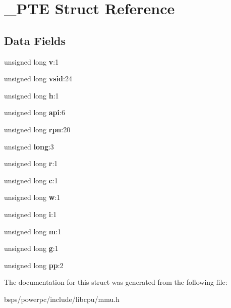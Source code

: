\hypertarget{struct__PTE}{}\section{\+\_\+\+P\+TE Struct Reference}
\label{struct__PTE}
\subsection*{Data Fields}
\begin{DoxyCompactItemize}
\item 
\mbox{\label{struct__PTE_a70ad49ce44082989ff1f60711ac51748}} 
unsigned long {\bfseries v}\+:1
\item 
\mbox{\label{struct__PTE_ac9c646f44d5a310f3ac6ddd9509c4a63}} 
unsigned long {\bfseries vsid}\+:24
\item 
\mbox{\label{struct__PTE_a904024784e0847ef42a912ab118cf076}} 
unsigned long {\bfseries h}\+:1
\item 
\mbox{\label{struct__PTE_af555329e27c18bd6774c843ef9d77883}} 
unsigned long {\bfseries api}\+:6
\item 
\mbox{\label{struct__PTE_a1af864ad9c7d66af85899ac195d205fe}} 
unsigned long {\bfseries rpn}\+:20
\item 
\mbox{\label{struct__PTE_a8372f14e7e33b411216048b5236528a8}} 
unsigned {\bfseries long}\+:3
\item 
\mbox{\label{struct__PTE_ab05728d02334349ec34102603190da11}} 
unsigned long {\bfseries r}\+:1
\item 
\mbox{\label{struct__PTE_a879a5ebfc7fc5fd881fb7c9452f01c7d}} 
unsigned long {\bfseries c}\+:1
\item 
\mbox{\label{struct__PTE_a800a5674fa52faa6212ea2036db3b273}} 
unsigned long {\bfseries w}\+:1
\item 
\mbox{\label{struct__PTE_aee3b9bae06298d3ed3a8cfe25d4ec48c}} 
unsigned long {\bfseries i}\+:1
\item 
\mbox{\label{struct__PTE_ae6d38f07c7c6c13ed717beaf870cd77c}} 
unsigned long {\bfseries m}\+:1
\item 
\mbox{\label{struct__PTE_a486a1585582d4f89a1af06b04c9b240a}} 
unsigned long {\bfseries g}\+:1
\item 
\mbox{\label{struct__PTE_a54dab297f94f19da3d6ab3098789e445}} 
unsigned long {\bfseries pp}\+:2
\end{DoxyCompactItemize}


The documentation for this struct was generated from the following file\+:\begin{DoxyCompactItemize}
\item 
bsps/powerpc/include/libcpu/mmu.\+h\end{DoxyCompactItemize}
